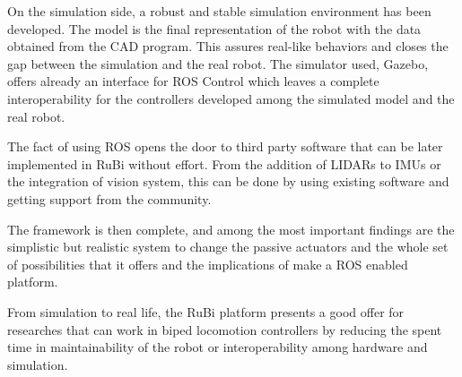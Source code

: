 On the simulation side, a robust and stable simulation environment has been developed.
The model is the final representation of the robot with the data obtained from the CAD program.
This assures real-like behaviors and closes the gap between the simulation and the real robot.
The simulator used, Gazebo, offers already an interface for ROS Control which leaves a complete interoperability for the controllers developed among the simulated model and the real robot.

The fact of using ROS opens the door to third party software that can be later implemented in RuBi without effort.
From the addition of LIDARs to IMUs or the integration of vision system, this can be done by using existing software and getting support from the community.


The framework is then complete, and among the most important findings are the simplistic but realistic system to change the passive actuators and the whole set of possibilities that it offers and the implications of make a ROS enabled platform.

From simulation to real life, the RuBi platform presents a good offer for researches that can work in biped locomotion controllers by reducing the spent time in maintainability of the robot or interoperability among hardware and simulation.

